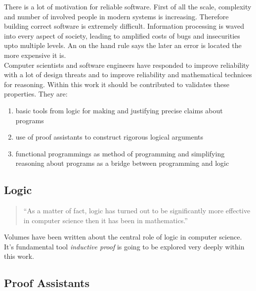 There is a lot of motivation for reliable software. 
First of all the scale, complexity and number of involved people in modern systems is increasing.
Therefore building correct software is extremely difficult.
Information processing is waved into every aspect of society, leading to amplified costs of bugs and insecurities upto multiple levels. An on the hand rule says the later an error is located the more expensive it is.\\
Computer scientists and software engineers have responded to improve reliability with a lot of design threats and to improve reliability and mathematical technices for reasoning.
Within this work it should be contributed to validates these properties. 
They are:
\begin{enumerate}
\item basic tools from logic for making and justifying precise claims about programs
\item use of proof assistants to construct rigorous logical arguments
\item functional programmings as method of programming and simplifying reasoning about programs as a bridge between programming and logic
\end{enumerate}



\subsection{Logic}
\label{subsec:logic}

\begin{quote}
``As a matter of fact, logic has turned out to be significantly more effective in computer science then it has been in mathematics.'' \cite{PACGGHSY} 
\end{quote}
Volumes have been written about the central role of logic in computer science. 
It's fundamental tool {\itshape inductive proof} is going to be explored very deeply within this work.


\subsection{Proof Assistants}
\label{subsec:proofassistants}

